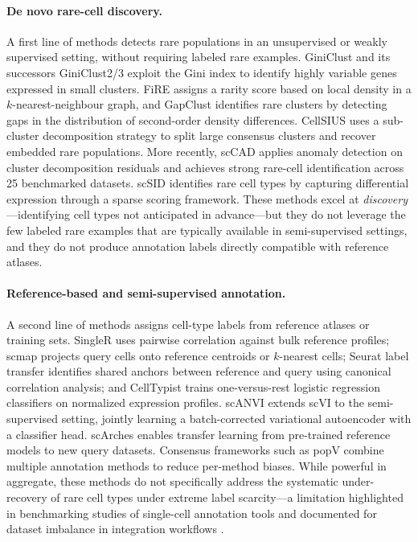 \paragraph{De novo rare-cell discovery.}
A first line of methods detects rare populations in an unsupervised or weakly supervised setting, without requiring labeled rare examples. GiniClust \citep{jiang2016giniclust} and its successors GiniClust2/3 exploit the Gini index to identify highly variable genes expressed in small clusters. FiRE \citep{jindal2018fire} assigns a rarity score based on local density in a $k$-nearest-neighbour graph, and GapClust \citep{fang2021gapclust} identifies rare clusters by detecting gaps in the distribution of second-order density differences. CellSIUS \citep{wegmann2019cellsius} uses a sub-cluster decomposition strategy to split large consensus clusters and recover embedded rare populations. More recently, scCAD \citep{xu2024scCAD} applies anomaly detection on cluster decomposition residuals and achieves strong rare-cell identification across 25 benchmarked datasets. scSID \citep{gao2023scsid} identifies rare cell types by capturing differential expression through a sparse scoring framework. These methods excel at \emph{discovery}---identifying cell types not anticipated in advance---but they do not leverage the few labeled rare examples that are typically available in semi-supervised settings, and they do not produce annotation labels directly compatible with reference atlases.

\paragraph{Reference-based and semi-supervised annotation.}
A second line of methods assigns cell-type labels from reference atlases or training sets. SingleR \citep{aran2019reference} uses pairwise correlation against bulk reference profiles; scmap \citep{kiselev2018scmap} projects query cells onto reference centroids or $k$-nearest cells; Seurat label transfer \citep{stuart2019comprehensive} identifies shared anchors between reference and query using canonical correlation analysis; and CellTypist \citep{dominguez2022cross} trains one-versus-rest logistic regression classifiers on normalized expression profiles. scANVI \citep{xu2021probabilistic} extends scVI \citep{lopez2018deep} to the semi-supervised setting, jointly learning a batch-corrected variational autoencoder with a classifier head. scArches \citep{lotfollahi2022mapping} enables transfer learning from pre-trained reference models to new query datasets. Consensus frameworks such as popV \citep{hao2024consensus} combine multiple annotation methods to reduce per-method biases. While powerful in aggregate, these methods do not specifically address the systematic under-recovery of rare cell types under extreme label scarcity---a limitation highlighted in benchmarking studies of single-cell annotation tools \citep{abdelaal2019comparison,luecken2021benchmarking} and documented for dataset imbalance in integration workflows \citep{tian2023impacts}.

